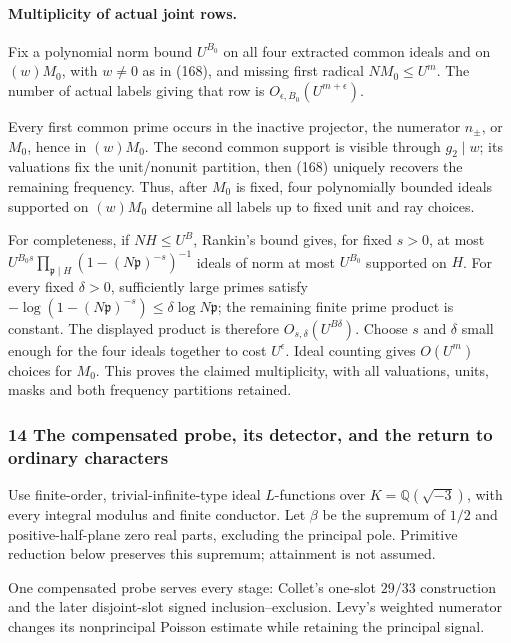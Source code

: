 \paragraph{Multiplicity of actual joint rows.}
Fix a polynomial norm bound \(U^{B_0}\) on all four extracted common
ideals and on \((w)M_0\), with \(w\ne0\) as in (168), and missing
first radical \(NM_0\le U^m\). The number of actual labels giving
that row is \(O_{\epsilon,B_0}(U^{m+\epsilon})\).

Every first common prime occurs in the inactive projector, the numerator
\(n_\pm\), or \(M_0\), hence in \((w)M_0\). The second common
support is visible through \(g_2\mid w\); its valuations fix the
unit/nonunit partition, then (168) uniquely recovers the remaining
frequency. Thus, after \(M_0\) is fixed, four polynomially bounded
ideals supported on \((w)M_0\) determine all labels up to fixed unit
and ray choices.

For completeness, if \(NH\le U^B\), Rankin's bound gives, for fixed
\(s>0\), at most
\(U^{B_0s}\prod_{\mathfrak p\mid H}(1-(N\mathfrak p)^{-s})^{-1}\)
ideals of norm at most \(U^{B_0}\) supported on \(H\).
For every fixed \(\delta>0\), sufficiently large primes satisfy
\(-\log(1-(N\mathfrak p)^{-s})\le\delta\log N\mathfrak p\);
the remaining finite prime product is constant. The displayed product
is therefore \(O_{s,\delta}(U^{B\delta})\). Choose \(s\) and
\(\delta\) small enough for the four ideals together to cost
\(U^\epsilon\). Ideal counting gives \(O(U^m)\) choices for
\(M_0\). This proves the claimed multiplicity, with all valuations,
units, masks and both frequency partitions retained.
\hypertarget{the-compensated-probe-its-detector-and-the-return-to-ordinary-characters}{%
\subsubsection{14 The compensated probe, its detector, and the return to ordinary characters}\label{the-compensated-probe-its-detector-and-the-return-to-ordinary-characters}}

Use finite-order, trivial-infinite-type ideal \(L\)-functions over \(K=\mathbb Q(\sqrt{-3})\), with every integral modulus and finite conductor. Let \(\beta\) be the supremum of \(1/2\) and positive-half-plane zero real parts, excluding the principal pole. Primitive reduction below preserves this supremum; attainment is not assumed.

One compensated probe serves every stage: Collet's one-slot \(29/33\) construction and the later disjoint-slot signed inclusion--exclusion. Levy's weighted numerator changes its nonprincipal Poisson estimate while retaining the principal signal.


